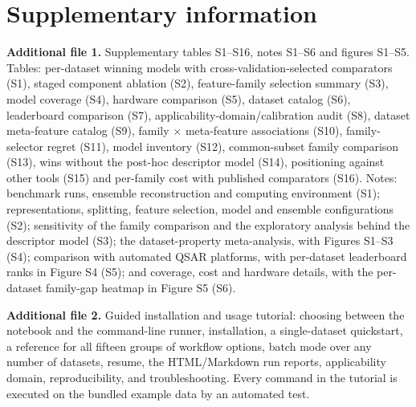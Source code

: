 \documentclass[pdflatex,sn-vancouver-num,Numbered]{sn-jnl}%
\begin{document}
\section*{Supplementary information}

\textbf{Additional file 1.} Supplementary tables S1--S16, notes S1--S6 and figures S1--S5. Tables: per-dataset winning models with cross-validation-selected comparators (S1), staged component ablation (S2), feature-family selection summary (S3), model coverage (S4), hardware comparison (S5), dataset catalog (S6), leaderboard comparison (S7), applicability-domain/calibration audit (S8), dataset meta-feature catalog (S9), family $\times$ meta-feature associations (S10), family-selector regret (S11), model inventory (S12), common-subset family comparison (S13), wins without the post-hoc descriptor model (S14), positioning against other tools (S15) and per-family cost with published comparators (S16). Notes: benchmark runs, ensemble reconstruction and computing environment (S1); representations, splitting, feature selection, model and ensemble configurations (S2); sensitivity of the family comparison and the exploratory analysis behind the descriptor model (S3); the dataset-property meta-analysis, with Figures S1--S3 (S4); comparison with automated QSAR platforms, with per-dataset leaderboard ranks in Figure S4 (S5); and coverage, cost and hardware details, with the per-dataset family-gap heatmap in Figure S5 (S6).

\textbf{Additional file 2.} Guided installation and usage tutorial: choosing between the notebook and the command-line runner, installation, a single-dataset quickstart, a reference for all fifteen groups of workflow options, batch mode over any number of datasets, resume, the HTML/Markdown run reports, applicability domain, reproducibility, and troubleshooting. Every command in the tutorial is executed on the bundled example data by an automated test.




\end{document}
